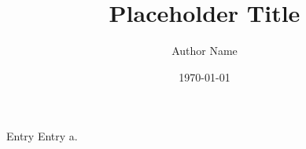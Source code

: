 \documentclass[english,type=master-thesis,license=CCBY,paper=a4]{thesis}
\title{Placeholder Title}
\author{Author Name}
\date{\today}
\begin{document}
\frontmatter
\maketitle
Entry
Entry a.
\gdef\SatexReachedEnd{}
\end{document}
